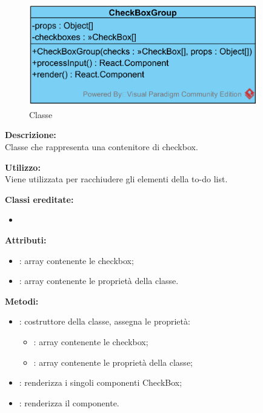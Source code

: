 \paragraph[::CheckBoxGroup]{\class}\mbox{}\\ \label{\class}
\begin{figure}[H]
	\centering
	\includegraphics[width=10cm]{./diagrammi/framework/view/gui/checkboxgroup.png}
	\caption{Classe \class}
\end{figure}
\textbf{Descrizione:}\\
Classe che rappresenta una contenitore di checkbox.

\textbf{Utilizzo:}\\
Viene utilizzata per racchiudere gli elementi della to-do list.

\textbf{Classi ereditate:}
\begin{itemize}
	\item {}
\end{itemize}


\textbf{Attributi:}
\begin{itemize}
	\item {}: array contenente le checkbox;
	\item {}: array contenente le proprietà della classe.
\end{itemize}

\textbf{Metodi:}
\begin{itemize}
	\item {}: costruttore della classe, assegna le proprietà:
	\begin{itemize}
		\item {}: array contenente le checkbox;
		\item {}: array contenente le proprietà della classe;
	\end{itemize}
	\item {}: renderizza i singoli componenti CheckBox;
	\item {}: renderizza il componente.
\end{itemize}

